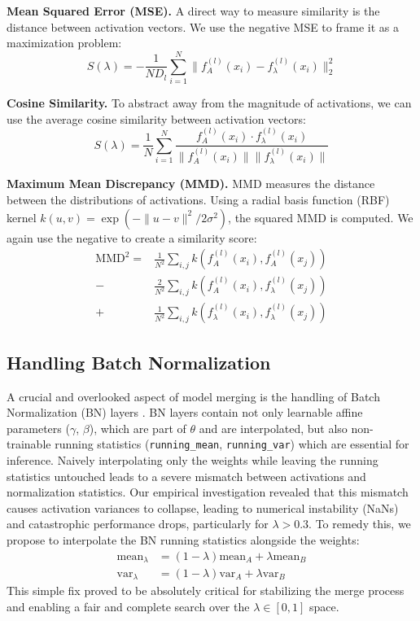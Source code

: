 \documentclass{article}
\theoremstyle{plain}
\theoremstyle{definition}
\theoremstyle{remark}
\begin{document}
\textbf{Mean Squared Error (MSE).} A direct way to measure similarity is the distance between activation vectors. We use the negative MSE to frame it as a maximization problem:
\begin{equation}
S(\lambda) = - \frac{1}{N D_l} \sum_{i=1}^N \| f_A^{(l)}(x_i) - f_\lambda^{(l)}(x_i) \|_2^2
\end{equation}

\textbf{Cosine Similarity.} To abstract away from the magnitude of activations, we can use the average cosine similarity between activation vectors:
\begin{equation}
S(\lambda) = \frac{1}{N} \sum_{i=1}^N \frac{f_A^{(l)}(x_i) \cdot f_\lambda^{(l)}(x_i)}{\| f_A^{(l)}(x_i) \| \| f_\lambda^{(l)}(x_i) \|}
\end{equation}

\textbf{Maximum Mean Discrepancy (MMD).} MMD measures the distance between the distributions of activations. Using a radial basis function (RBF) kernel $k(u,v) = \exp(-\|u-v\|^2 / 2\sigma^2)$, the squared MMD is computed. We again use the negative to create a similarity score:
\begin{align}
\text{MMD}^2 = &\frac{1}{N^2} \sum_{i,j} k(f_A^{(l)}(x_i), f_A^{(l)}(x_j)) \nonumber \\
                - &\frac{2}{N^2} \sum_{i,j} k(f_A^{(l)}(x_i), f_\lambda^{(l)}(x_j)) \nonumber \\
                + &\frac{1}{N^2} \sum_{i,j} k(f_\lambda^{(l)}(x_i), f_\lambda^{(l)}(x_j))
\end{align}

\subsection{Handling Batch Normalization}
A crucial and overlooked aspect of model merging is the handling of Batch Normalization (BN) layers \citep{ioffe2015batch}. BN layers contain not only learnable affine parameters ($\gamma$, $\beta$), which are part of $\theta$ and are interpolated, but also non-trainable running statistics (\texttt{running\_mean}, \texttt{running\_var}) which are essential for inference. Naively interpolating only the weights while leaving the running statistics untouched leads to a severe mismatch between activations and normalization statistics.
Our empirical investigation revealed that this mismatch causes activation variances to collapse, leading to numerical instability (NaNs) and catastrophic performance drops, particularly for $\lambda > 0.3$. To remedy this, we propose to interpolate the BN running statistics alongside the weights:
\begin{align}
\text{mean}_\lambda &= (1-\lambda)\text{mean}_A + \lambda\text{mean}_B \\
\text{var}_\lambda &= (1-\lambda)\text{var}_A + \lambda\text{var}_B
\end{align}
This simple fix proved to be absolutely critical for stabilizing the merge process and enabling a fair and complete search over the $\lambda \in [0, 1]$ space.
\end{document}
